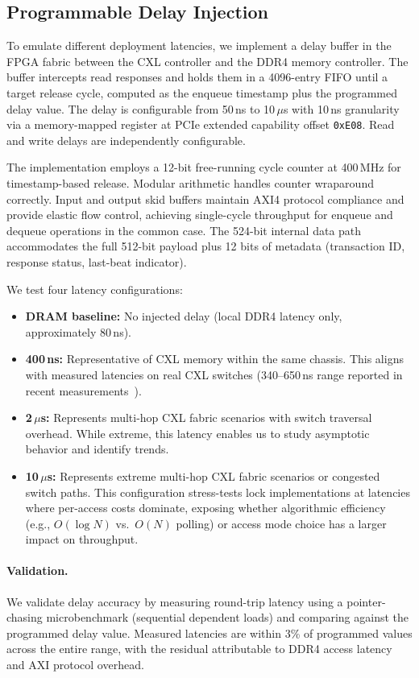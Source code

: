 \subsection{Programmable Delay Injection}

To emulate different deployment latencies, we implement a delay buffer in the FPGA fabric between the CXL controller and the DDR4 memory controller.
The buffer intercepts read responses and holds them in a 4096-entry FIFO until a target release cycle, computed as the enqueue timestamp plus the programmed delay value.
The delay is configurable from 50\,ns to 10\,$\mu$s with 10\,ns granularity via a memory-mapped register at PCIe extended capability offset \texttt{0xE08}.
Read and write delays are independently configurable.

The implementation employs a 12-bit free-running cycle counter at 400\,MHz for timestamp-based release.
Modular arithmetic handles counter wraparound correctly.
Input and output skid buffers maintain AXI4 protocol compliance and provide elastic flow control, achieving single-cycle throughput for enqueue and dequeue operations in the common case.
The 524-bit internal data path accommodates the full 512-bit payload plus 12 bits of metadata (transaction ID, response status, last-beat indicator).

We test four latency configurations:
\begin{itemize}
    \item \textbf{DRAM baseline:} No injected delay (local DDR4 latency only, approximately 80\,ns).
    \item \textbf{400\,ns:} Representative of CXL memory within the same chassis. This aligns with measured latencies on real CXL switches (340--650\,ns range reported in recent measurements~\cite{yangUnlockingPotentialCXL2025}).
    \item \textbf{2\,$\mu$s:} Represents multi-hop CXL fabric scenarios with switch traversal overhead. While extreme, this latency enables us to study asymptotic behavior and identify trends.
    \item \textbf{10\,$\mu$s:} Represents extreme multi-hop CXL fabric scenarios or congested switch paths. This configuration stress-tests lock implementations at latencies where per-access costs dominate, exposing whether algorithmic efficiency (e.g., $O(\log N)$ vs.\ $O(N)$ polling) or access mode choice has a larger impact on throughput.
\end{itemize}

\paragraph{Validation.}
We validate delay accuracy by measuring round-trip latency using a pointer-chasing microbenchmark (sequential dependent loads) and comparing against the programmed delay value.
Measured latencies are within 3\% of programmed values across the entire range, with the residual attributable to DDR4 access latency and AXI protocol overhead.

